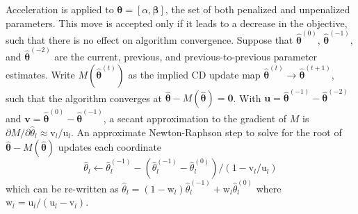 \documentclass[12pt]{article}
\newcommand{\sgl}{\setstretch{1.1}}
\newcommand{\bs}[1]{\boldsymbol{#1}}
\newcommand{\mr}[1]{\mathrm{#1}}
\newcommand{\bm}[1]{\mathbf{#1}}
\begin{document}
Acceleration is applied to $\bs{\theta} = [\alpha,\bs{\beta}]$, the
set of both penalized and unpenalized parameters.  This move is
accepted only if it leads to a decrease in the objective,
such that there is no effect on algorithm convergence.
Suppose that $\bs{\hat\theta}^{(0)}$, $\bs{\hat\theta}^{(-1)}$, and
$\bs{\hat\theta}^{(-2)}$ are the current, previous, and
previous-to-previous parameter estimates.  Write
$M(\bs{\hat\theta}^{(t)})$ as the implied CD update map
$\bs{\hat\theta}^{(t)} \rightarrow \bs{\hat\theta}^{(t+1)}$, such that
the algorithm converges at $\bs{\hat\theta} - M(\bs{\hat\theta}) =
\bm{0}$.  With $\bm{u} = \bs{\hat\theta}^{(-1)} -
\bs{\hat\theta}^{(-2)}$ and $\bm{v} = \bs{\hat\theta}^{(0)} -
\bs{\hat\theta}^{(-1)}$, a secant approximation to the gradient of $M$
is $\partial M/\partial \hat\theta_l \approx \mr{v}_l/\mr{u}_l$.  An
approximate Newton-Raphson step to solve for the root of
$\bs{\hat\theta} - M(\bs{\hat\theta}) $  updates each
coordinate
\[
\hat \theta_l \gets
\hat\theta_l^{(-1)} - (\hat\theta_l^{(-1)} -
\hat\theta_l^{(0)})/(1-\mr{v}_l/\mr{u}_l)
\] which can be re-written as $\hat\theta_l =
(1-\mr{w}_l)\hat\theta_l^{(-1)} + \mr{w}_l\hat\theta_l^{(0)} $ where
$\mr{w}_l = \mr{u}_l/(\mr{u}_l - \mr{v}_l)$.


\sgl\small


\end{document}
